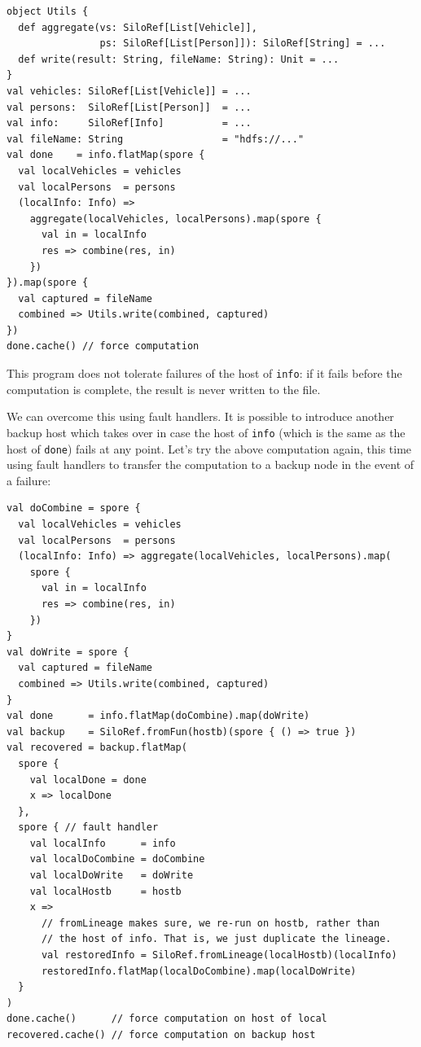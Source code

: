 \documentclass{jfp1}
\begin{document}
\vspace{-0.8mm}
\begin{lstlisting}
object Utils {
  def aggregate(vs: SiloRef[List[Vehicle]],
                ps: SiloRef[List[Person]]): SiloRef[String] = ...
  def write(result: String, fileName: String): Unit = ...
}
val vehicles: SiloRef[List[Vehicle]] = ...
val persons:  SiloRef[List[Person]]  = ...
val info:     SiloRef[Info]          = ...
val fileName: String                 = "hdfs://..."
val done    = info.flatMap(spore {
  val localVehicles = vehicles
  val localPersons  = persons
  (localInfo: Info) =>
    aggregate(localVehicles, localPersons).map(spore {
      val in = localInfo
      res => combine(res, in)
    })
}).map(spore {
  val captured = fileName
  combined => Utils.write(combined, captured)
})
done.cache() // force computation
\end{lstlisting}
\noindent
This program does not tolerate failures of the host of \verb|info|: if it fails
before the computation is complete, the result is never written to the file.

We can overcome this using fault handlers. It is possible to introduce another
backup host which takes over in case the host of \verb|info| (which is the same
as the host of \verb|done|) fails at any point. Let's try the above computation
again, this time using fault handlers to transfer the computation to a backup
node in the event of a failure:

\begin{lstlisting}
val doCombine = spore {
  val localVehicles = vehicles
  val localPersons  = persons
  (localInfo: Info) => aggregate(localVehicles, localPersons).map(
    spore {
      val in = localInfo
      res => combine(res, in)
    })
}
val doWrite = spore {
  val captured = fileName
  combined => Utils.write(combined, captured)
}
val done      = info.flatMap(doCombine).map(doWrite)
val backup    = SiloRef.fromFun(hostb)(spore { () => true })
val recovered = backup.flatMap(
  spore {
    val localDone = done
    x => localDone
  },
  spore { // fault handler
    val localInfo      = info
    val localDoCombine = doCombine
    val localDoWrite   = doWrite
    val localHostb     = hostb
    x =>
      // fromLineage makes sure, we re-run on hostb, rather than
      // the host of info. That is, we just duplicate the lineage.
      val restoredInfo = SiloRef.fromLineage(localHostb)(localInfo)
      restoredInfo.flatMap(localDoCombine).map(localDoWrite)
  }
)
done.cache()      // force computation on host of local
recovered.cache() // force computation on backup host
\end{lstlisting}
\noindent
\end{document}
